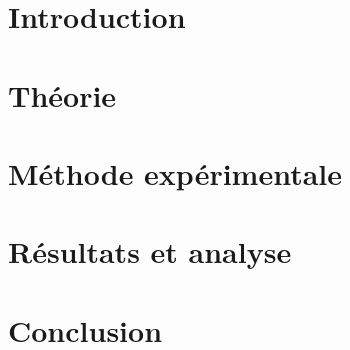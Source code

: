 \documentclass[a4paper, 11pt,twoside=true]{scrartcl} %
\begin{document}

\maketitle

\tableofcontents %
\newpage


\section{Introduction}
\section{Théorie}
\section{Méthode expérimentale}
\section{Résultats et analyse}
\section{Conclusion}



\begin{thebibliography}{widest entry}
\end{thebibliography}	



\end{document}

